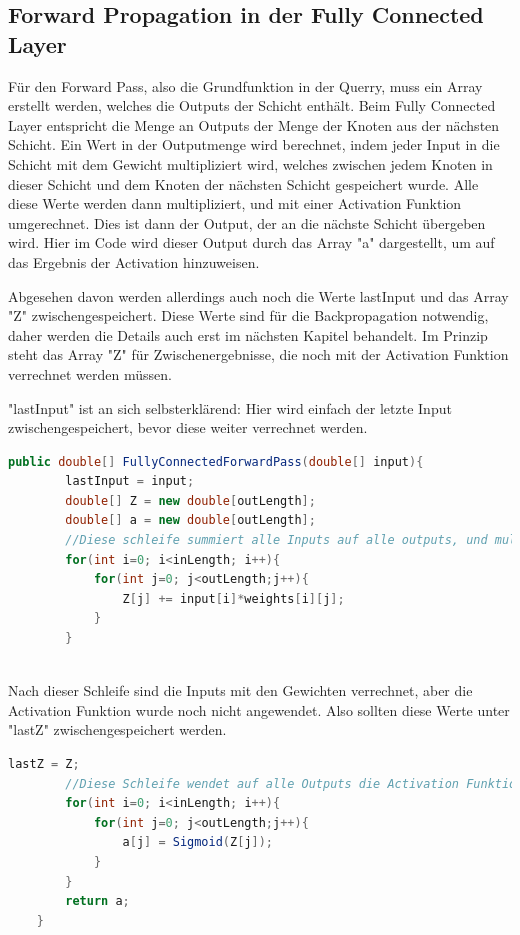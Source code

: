 \documentclass[12pt]{article}
\begin{document}
\subsection{Forward Propagation in der Fully Connected Layer}

Für den Forward Pass, also die Grundfunktion in der Querry, muss ein Array erstellt werden, welches die Outputs der Schicht enthält. Beim Fully Connected Layer entspricht die Menge an Outputs der Menge der Knoten aus der nächsten Schicht. Ein Wert in der Outputmenge wird berechnet, indem jeder Input in die Schicht mit dem Gewicht multipliziert wird, welches zwischen jedem Knoten in dieser Schicht und dem Knoten der nächsten Schicht gespeichert wurde. Alle diese Werte werden dann multipliziert, und mit einer Activation Funktion umgerechnet. Dies ist dann der Output, der an die nächste Schicht übergeben wird. Hier im Code wird dieser Output durch das Array "a" dargestellt, um auf das Ergebnis der Activation hinzuweisen.

Abgesehen davon werden allerdings auch noch die Werte lastInput und das Array "Z" zwischengespeichert. Diese Werte sind für die Backpropagation notwendig, daher werden die Details auch erst im nächsten Kapitel behandelt. Im Prinzip steht das Array "Z" für Zwischenergebnisse, die noch mit der Activation Funktion verrechnet werden müssen.

"lastInput" ist an sich selbsterklärend: Hier wird einfach der letzte Input zwischengespeichert, bevor diese weiter verrechnet werden.
\clearpage
\begin{lstlisting}[language=Java]
    public double[] FullyConnectedForwardPass(double[] input){
        lastInput = input;
        double[] Z = new double[outLength];
        double[] a = new double[outLength];
        //Diese schleife summiert alle Inputs auf alle outputs, und multipliziert die Inputs mit ihren jeweiligen gewichten aus der weights-Matrix
        for(int i=0; i<inLength; i++){
            for(int j=0; j<outLength;j++){
                Z[j] += input[i]*weights[i][j];
            }
        }
        
\end{lstlisting}
Nach dieser Schleife sind die Inputs mit den Gewichten verrechnet, aber die Activation Funktion wurde noch nicht angewendet. Also sollten diese Werte unter "lastZ" zwischengespeichert werden.
\begin{lstlisting}[language=Java] 
        lastZ = Z;
		//Diese Schleife wendet auf alle Outputs die Activation Funktion an, in diesem Falle die Sigmoid Funktion
        for(int i=0; i<inLength; i++){
            for(int j=0; j<outLength;j++){
                a[j] = Sigmoid(Z[j]);
            }
        }
        return a;
    }
\end{lstlisting} 
\end{document}
